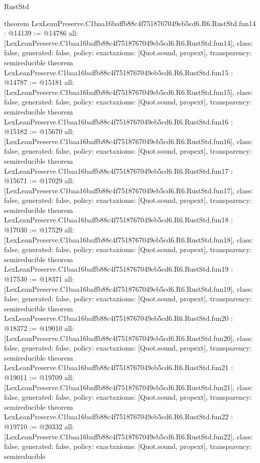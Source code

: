 \begin{lexlean}{RustStd}
\begin{coremodule}
{}
theorem LexLeanPreserve.C1baa16baffb88c4f7518767049eb5cd6.R6.RustStd.fun14 : @14139 := @14786 {
  all: [LexLeanPreserve.C1baa16baffb88c4f7518767049eb5cd6.R6.RustStd.fun14],
  class: false,
  generated: false,
  policy: exact{axioms: [Quot.sound, propext]},
  transparency: semireducible
}
theorem LexLeanPreserve.C1baa16baffb88c4f7518767049eb5cd6.R6.RustStd.fun15 : @14787 := @15181 {
  all: [LexLeanPreserve.C1baa16baffb88c4f7518767049eb5cd6.R6.RustStd.fun15],
  class: false,
  generated: false,
  policy: exact{axioms: [Quot.sound, propext]},
  transparency: semireducible
}
theorem LexLeanPreserve.C1baa16baffb88c4f7518767049eb5cd6.R6.RustStd.fun16 : @15182 := @15670 {
  all: [LexLeanPreserve.C1baa16baffb88c4f7518767049eb5cd6.R6.RustStd.fun16],
  class: false,
  generated: false,
  policy: exact{axioms: [Quot.sound, propext]},
  transparency: semireducible
}
theorem LexLeanPreserve.C1baa16baffb88c4f7518767049eb5cd6.R6.RustStd.fun17 : @15671 := @17029 {
  all: [LexLeanPreserve.C1baa16baffb88c4f7518767049eb5cd6.R6.RustStd.fun17],
  class: false,
  generated: false,
  policy: exact{axioms: [Quot.sound, propext]},
  transparency: semireducible
}
theorem LexLeanPreserve.C1baa16baffb88c4f7518767049eb5cd6.R6.RustStd.fun18 : @17030 := @17529 {
  all: [LexLeanPreserve.C1baa16baffb88c4f7518767049eb5cd6.R6.RustStd.fun18],
  class: false,
  generated: false,
  policy: exact{axioms: [Quot.sound, propext]},
  transparency: semireducible
}
theorem LexLeanPreserve.C1baa16baffb88c4f7518767049eb5cd6.R6.RustStd.fun19 : @17530 := @18371 {
  all: [LexLeanPreserve.C1baa16baffb88c4f7518767049eb5cd6.R6.RustStd.fun19],
  class: false,
  generated: false,
  policy: exact{axioms: [Quot.sound, propext]},
  transparency: semireducible
}
theorem LexLeanPreserve.C1baa16baffb88c4f7518767049eb5cd6.R6.RustStd.fun20 : @18372 := @19010 {
  all: [LexLeanPreserve.C1baa16baffb88c4f7518767049eb5cd6.R6.RustStd.fun20],
  class: false,
  generated: false,
  policy: exact{axioms: [Quot.sound, propext]},
  transparency: semireducible
}
theorem LexLeanPreserve.C1baa16baffb88c4f7518767049eb5cd6.R6.RustStd.fun21 : @19011 := @19709 {
  all: [LexLeanPreserve.C1baa16baffb88c4f7518767049eb5cd6.R6.RustStd.fun21],
  class: false,
  generated: false,
  policy: exact{axioms: [Quot.sound, propext]},
  transparency: semireducible
}
theorem LexLeanPreserve.C1baa16baffb88c4f7518767049eb5cd6.R6.RustStd.fun22 : @19710 := @20332 {
  all: [LexLeanPreserve.C1baa16baffb88c4f7518767049eb5cd6.R6.RustStd.fun22],
  class: false,
  generated: false,
  policy: exact{axioms: [Quot.sound, propext]},
  transparency: semireducible
}
\end{coremodule}
\end{lexlean}
